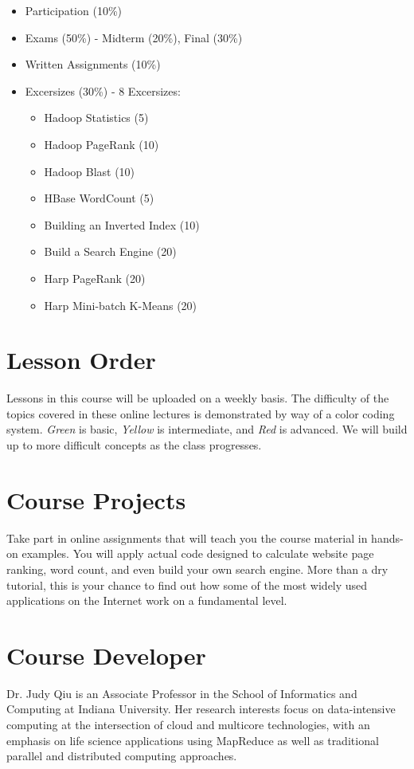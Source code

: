\begin{itemize}
  \item Participation (10\%)
  \item Exams (50\%) - Midterm (20\%), Final (30\%)
  \item Written Assignments (10\%)
  \item Excersizes (30\%) - 8 Excersizes: 
    \begin{itemize}
      \item Hadoop Statistics (5)
      \item Hadoop PageRank (10)
      \item Hadoop Blast (10)
      \item HBase WordCount (5)
      \item Building an Inverted Index (10)
      \item Build a Search Engine (20)
      \item Harp PageRank (20)
      \item Harp Mini-batch K-Means (20)
    \end{itemize}
\end{itemize}

\section{Lesson Order}

Lessons in this course will be uploaded on a weekly basis. The
difficulty of the topics covered in these online lectures is
demonstrated by way of a color coding system. {\em Green} is basic,
{\em Yellow} is intermediate, and {\em Red} is advanced. We will build
up to more difficult concepts as the class progresses.

\section{Course Projects}

Take part in online assignments that will teach you the course
material in hands-on examples. You will apply actual code designed to
calculate website page ranking, word count, and even build your own
search engine. More than a dry tutorial, this is your chance to find
out how some of the most widely used applications on the Internet work
on a fundamental level.

\section{Course Developer}
Dr. Judy Qiu is an Associate Professor in the School of Informatics
and Computing at Indiana University. Her research interests focus on
data-intensive computing at the intersection of cloud and multicore
technologies, with an emphasis on life science applications using
MapReduce as well as traditional parallel and distributed computing
approaches.

